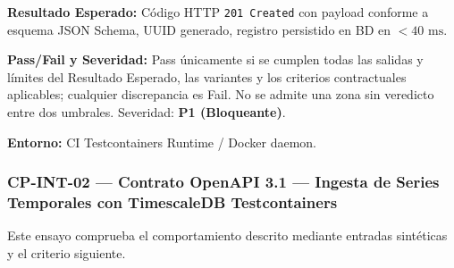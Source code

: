 \par\noindent\textbf{Resultado Esperado:} Código HTTP \texttt{2\allowbreak{}0\allowbreak{}1\allowbreak{} C\allowbreak{}r\allowbreak{}e\allowbreak{}a\allowbreak{}t\allowbreak{}e\allowbreak{}d\allowbreak{}} con payload conforme a esquema JSON Schema, UUID generado, registro persistido en BD en \(< 40\text{ ms}\).\par
\par\noindent\textbf{Pass/Fail y Severidad:} Pass únicamente si se cumplen todas las salidas y límites del Resultado Esperado, las variantes y los criterios contractuales aplicables; cualquier discrepancia es Fail. No se admite una zona sin veredicto entre dos umbrales. Severidad: \textbf{P1 (Bloqueante)}.\par
\par\noindent\textbf{Entorno:} CI Testcontainers Runtime / Docker daemon.\par






\subsubsection*{CP-INT-02 — Contrato OpenAPI 3.1 — Ingesta de Series Temporales con TimescaleDB Testcontainers}\label{sec:9-cp-int-02}
Este ensayo comprueba el comportamiento descrito mediante entradas sintéticas y el criterio siguiente.

